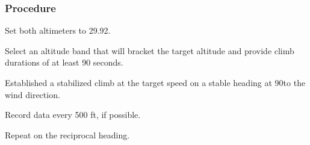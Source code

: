 % 
% 
%
 \subsubsection*{Procedure}
 \begin{compactenum}
   \item Set both altimeters to 29.92.
   \item Select an altitude band that will bracket the target altitude and provide climb durations of at least 90 seconds.
   \item Established a stabilized climb at the target speed on a stable heading at 90\textdegree to the wind direction.
   \item Record data every 500 ft, if possible.
   \item Repeat on the reciprocal heading.
   \end{compactenum}